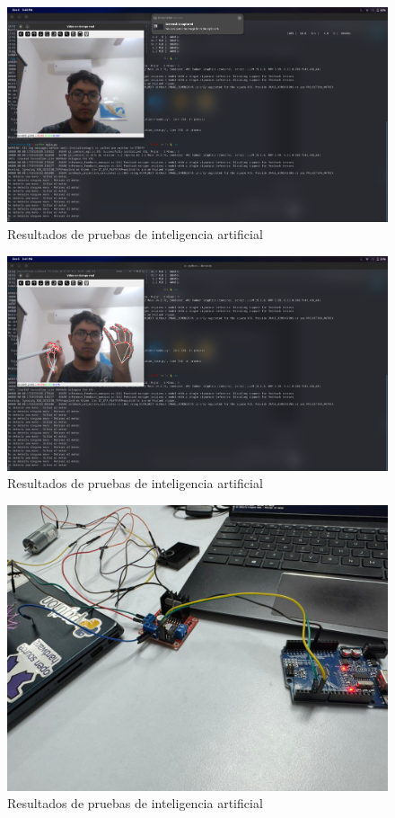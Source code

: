 \begin{figure}[H]
    \centering
    \includegraphics[width=1\textwidth]{img/PruebaIA5.png}
    \caption{Resultados de pruebas de inteligencia artificial}
    \label{fig:ai-test}
\end{figure}

\begin{figure}[H]
    \centering
    \includegraphics[width=1\textwidth]{img/PruebaIA6.png}
    \caption{Resultados de pruebas de inteligencia artificial}
    \label{fig:ai-test}
\end{figure}

\begin{figure}[H]
    \centering
    \includegraphics[width=1\textwidth]{img/PruebaIA7.png}
    \caption{Resultados de pruebas de inteligencia artificial}
    \label{fig:ai-test}
\end{figure}


